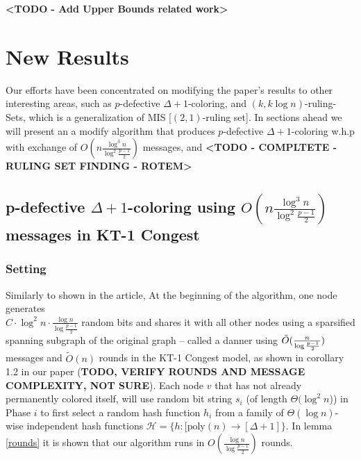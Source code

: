\documentclass[11pt]{article}
\begin{document}
\textbf{<TODO - Add Upper Bounds related work>}




\section{New Results}
Our efforts have been concentrated on modifying the paper's results to other interesting areas, such as $p$-defective $\Delta+1$-coloring, and $(k, k\log{n})$-ruling-Sets, which is a generalization of MIS [$(2,1)$-ruling set]. In sections ahead we will present an a modify algorithm that produces $p$-defective $\Delta+1$-coloring w.h.p with exchange of $O(n \frac{\log^3{n}}{\log^2{\frac{p-1}{2}}})$ messages, and \textbf{<TODO - COMPLTETE - RULING SET FINDING - ROTEM>}

\subsection{\texorpdfstring{p-defective $\Delta+1$-coloring using $O(n \frac{\log^3{n}}{\log^2{\frac{p-1}{2}}})$ messages in KT-1 Congest}{}}

\subsubsection*{Setting}
Similarly to shown in the article, At the beginning of the algorithm, one node generates \\ $C \cdot \log^2{n} \cdot \frac{\log{n}}{\log{\frac{p-1}{2}}}$ random bits and shares it with all other nodes using a  sparsified spanning subgraph of the original graph – called a danner \cite{Gmyr} using $\Tilde{O}(\frac{n}{\log{\frac{p-1}{2}}})$ messages and $\tilde{O}(n)$ rounds in the KT-1 Congest model, as shown in corollary 1.2 in our paper (\textbf{TODO, VERIFY ROUNDS AND MESSAGE COMPLEXITY, NOT SURE}). Each node $v$ that has not already permanently colored itself, will use random bit string $s_i$ (of length $\Theta(\log^2{n}$)) in Phase $i$ to first select a random hash function $h_i$ from a family of $\Theta(\log{n})$-wise independent hash functions $\mathcal{H}=\{h:[\text{poly}(n) \xrightarrow{} [\Delta+1] \}$. In lemma \ref{rounds} it is shown that our algorithm runs in $O(\frac{\log{n}}{\log{\frac{p-1}{2}}})$ rounds.
\end{document}
